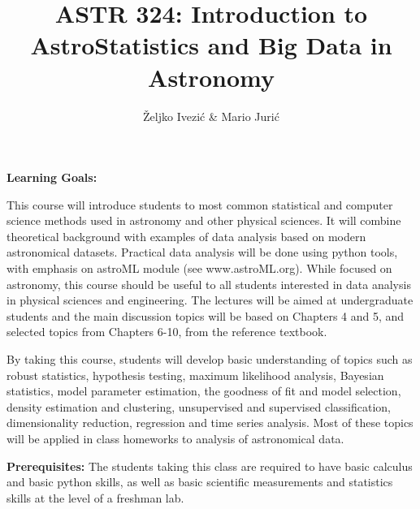 \documentclass[10pt]{article}
\title{ASTR 324: Introduction to AstroStatistics and Big Data in Astronomy}
\author{\v{Z}eljko Ivezi\'{c}  \& Mario Juri\'{c}}
\affil{University of Washington, Spring Quarter 2017}
\date{\vspace{-5ex}}
\begin{document}
\maketitle

\vskip 0.3in

\vskip 0.2in
\vskip 0.2in
\vskip 0.2in
\vskip 0.2in
\vskip 0.3in

{\bf Learning Goals:}

This course will introduce students to most common statistical and computer science methods 
used in astronomy and other physical sciences. It will combine theoretical background with 
examples of data analysis based on modern astronomical datasets. Practical data analysis 
will be done using python tools, with emphasis on astroML module (see www.astroML.org). 
While focused on astronomy, this course should be useful to all students interested in data 
analysis in physical sciences and engineering. The lectures will be aimed at undergraduate 
students and the main discussion topics will be based on  Chapters 4 and 5, and selected 
topics from Chapters 6-10, from the reference textbook. 

By taking this course, students will develop basic understanding of topics such as robust 
statistics, hypothesis testing, maximum likelihood analysis, Bayesian statistics, model 
parameter estimation, the goodness of fit and model selection, density estimation and 
clustering, unsupervised and supervised classification, dimensionality reduction, 
regression and time series analysis. Most of these topics will be applied in class homeworks 
to analysis of astronomical data. 

{\bf Prerequisites:}
The students taking this class are required to have basic calculus and basic python skills, 
as well as basic scientific measurements and statistics skills at the level of a freshman lab. 
\end{document}
